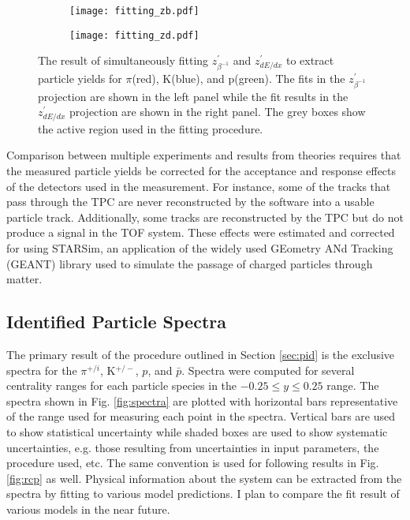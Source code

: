 	\begin{figure}
		\centering 
		\begin{subfigure}[b]{0.49\textwidth} 
			\texttt{[image: fitting\_zb.pdf]}  
		\end{subfigure} 
		\begin{subfigure}[b]{0.49\textwidth} 
			\texttt{[image: fitting\_zd.pdf]} 
		\end{subfigure}

		\caption{ \label{fig:fitting} The result of simultaneously fitting $z^{\prime}_{\beta^{-1}}$ and $z^{\prime}_{dE/dx}$ to extract particle yields for $\pi$(red), K(blue), and p(green). The fits in the $z^{\prime}_{\beta^{-1}}$ projection are shown in the left panel while the fit results in the $z^{\prime}_{dE/dx}$ projection are shown in the right panel. The grey boxes show the active region used in the fitting procedure. }  
	\end{figure}

	Comparison between multiple experiments and results from theories requires that the measured particle yields be corrected for the acceptance and response effects of the detectors used in the measurement. For instance, some of the tracks that pass through the TPC are never reconstructed by the software into a usable particle track. Additionally, some tracks are reconstructed by the TPC but do not produce a signal in the TOF system. These effects were estimated and corrected for using STARSim, an application of the widely used GEometry ANd Tracking (GEANT\cite{brun_geant3_1987}) library used to simulate the passage of charged particles through matter.

	\subsection{Identified Particle Spectra}

	The primary result of the procedure outlined in Section \ref{sec:pid} is the exclusive spectra for the $\pi^{+/i}$, K$^{+/-}$, $p$, and $\bar{p}$. Spectra were computed for several centrality ranges for each particle species in the $-0.25 \leq y \leq 0.25$ range. The spectra shown in Fig. \ref{fig:spectra} are plotted with horizontal bars representative of the \pt range used for measuring each point in the spectra. Vertical bars are used to show statistical uncertainty while shaded boxes are used to show systematic uncertainties, e.g. those resulting from uncertainties in input parameters, the procedure used, etc. The same convention is used for following results in Fig. \ref{fig:rcp} as well. Physical information about the system can be extracted from the spectra by fitting to various model predictions. I plan to compare the fit result of various models in the near future.

